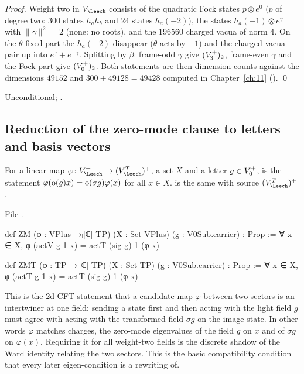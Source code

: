 \noindent\emph{Proof.} Weight two in $V_\Leech$ consists of the quadratic Fock states $p\otimes
e^0$ ($p$ of degree two: $300$ states $h_ah_b$ and $24$ states $h_a(-2)$), the states
$h_a(-1)\otimes e^\gamma$ with $\|\gamma\|^2=2$ (none: no roots), and the $196560$ charged vacua of norm
$4$. On the $\theta$-fixed part the $h_a(-2)$ disappear ($\theta$ acts by $-1$) and the charged vacua
pair up into $e^\gamma+e^{-\gamma}$. Splitting by $\beta$: frame-odd $\gamma$ give
$(V_3^{+})_2$, frame-even $\gamma$ and the Fock part give $(V_0^{+})_2$. Both statements are then
dimension counts against the dimensions $49152$ and $300+49128=49428$ computed in
Chapter~\ref{ch:11} (). \qed
\begin{status}
Unconditional; .
\end{status}

\subsection{Reduction of the zero-mode clause to letters and basis vectors}
\begin{definition}[\lean{ZM}]\label{ch13:def:ZM}
For a linear map $\varphi\colon V_\Leech^+\to(V_\Leech^T)^+$, a set $X$ and a letter $g\in V_0^{+}$,
 is the statement $\varphi(\operatorname{o}(g)x)=\operatorname{o}(\sigma g)\varphi(x)$ for all $x\in X$.
 is the same with source $(V_\Leech^T)^+$.
\end{definition}
\noindent File .
\begin{leancode}
def ZM (φ : VPlus →ₗ[ℂ] TP) (X : Set VPlus) (g : V0Sub.carrier) : Prop :=
  ∀ x ∈ X, φ (actV g 1 x) = actT (sig g) 1 (φ x)

def ZMT (φ : TP →ₗ[ℂ] TP) (X : Set TP) (g : V0Sub.carrier) : Prop :=
  ∀ x ∈ X, φ (actT g 1 x) = actT (sig g) 1 (φ x)
\end{leancode}
\begin{physics}
This is the 2d CFT statement that a candidate map $\varphi$ between two sectors is an intertwiner at one field: sending a state first and then acting with the light field $g$ must agree with acting with the transformed field $\sigma g$ on the image state. In other words $\varphi$ matches charges, the zero-mode eigenvalues of the field $g$ on $x$ and of $\sigma g$ on $\varphi(x)$. Requiring it for all weight-two fields is the discrete shadow of the Ward identity relating the two sectors. This is the basic compatibility condition that every later eigen-condition is a rewriting of.
\end{physics}

